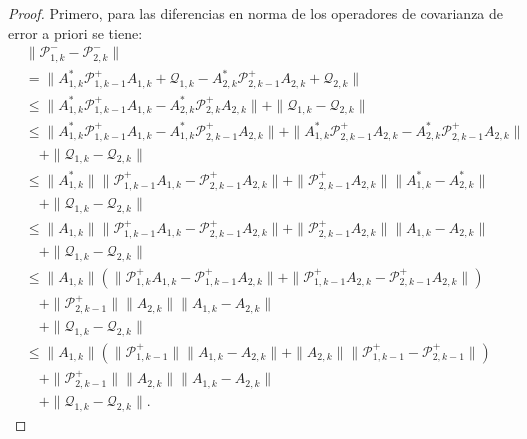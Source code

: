\begin{proof}
Primero, para las diferencias en norma de los operadores de covarianza de error a priori se tiene:
\begin{equation*}
	\begin{aligned}
		& \| \mathcal{P}_{1,k}^- - \mathcal{P}_{2,k}^-\| \\
		& = \| A_{1,k}^* \mathcal{P}_{1,k-1}^+ A_{1,k} + \mathcal{Q}_{1,k} - A_{2,k}^* \mathcal{P}_{2,k-1}^+ A_{2,k} + \mathcal{Q}_{2,k}  \| \\
		& \leq \|A_{1,k}^* \mathcal{P}_{1,k-1}^+ A_{1,k} - A_{2,k}^* \mathcal{P}_{2,k}^+ A_{2,k} \| + \| \mathcal{Q}_{1,k} - \mathcal{Q}_{2,k}  \| \\
		& \leq \|A_{1,k}^* \mathcal{P}_{1,k-1}^+ A_{1,k} - A_{1,k}^* \mathcal{P}_{2,k-1}^+ A_{2,k} \| +  \|A_{1,k}^* \mathcal{P}_{2,k-1}^+ A_{2,k} - A_{2,k}^* \mathcal{P}_{2,k-1}^+ A_{2,k} \| \\ 
		& \quad + \| \mathcal{Q}_{1,k} - \mathcal{Q}_{2,k}  \| \\
		& \leq \|A_{1,k}^* \| \| \mathcal{P}_{1,k-1}^+ A_{1,k} - \mathcal{P}_{2,k-1}^+ A_{2,k} \| + \| \mathcal{P}_{2,k-1}^+ A_{2,k}  \| \|A_{1,k}^* - A_{2,k}^* \| \\ 
		& \quad + \| \mathcal{Q}_{1,k} - \mathcal{Q}_{2,k}  \| \\
		& \leq \|A_{1,k} \| \| \mathcal{P}_{1,k-1}^+ A_{1,k} - \mathcal{P}_{2,k-1}^+ A_{2,k} \| + \| \mathcal{P}_{2,k-1}^+ A_{2,k}  \| \|A_{1,k} - A_{2,k} \| \\ 
		& \quad + \| \mathcal{Q}_{1,k} - \mathcal{Q}_{2,k}  \| \\
		& \leq \|A_{1,k} \| (\| \mathcal{P}_{1,k}^+ A_{1,k} - \mathcal{P}_{1,k-1}^+ A_{2,k} \| + \| \mathcal{P}_{1,k-1}^+ A_{2,k} - \mathcal{P}_{2,k-1}^+ A_{2,k} \| ) \\
		& \quad + \| \mathcal{P}_{2,k-1}^+ \| \| A_{2,k}  \| \|A_{1,k} - A_{2,k} \| \\ 
		& \quad + \| \mathcal{Q}_{1,k} - \mathcal{Q}_{2,k}  \| \\
		& \leq \|A_{1,k} \| ( \| \mathcal{P}_{1,k-1}^+ \| \|  A_{1,k} - A_{2,k} \| + \| A_{2,k} \| \| \mathcal{P}_{1,k-1}^+  - \mathcal{P}_{2,k-1}^+  \| ) \\
		& \quad + \| \mathcal{P}_{2,k-1}^+ \| \| A_{2,k}  \| \|A_{1,k} - A_{2,k} \| \\ 
		& \quad + \| \mathcal{Q}_{1,k} - \mathcal{Q}_{2,k}  \|.
	\end{aligned}
\end{equation*}


\end{proof}
